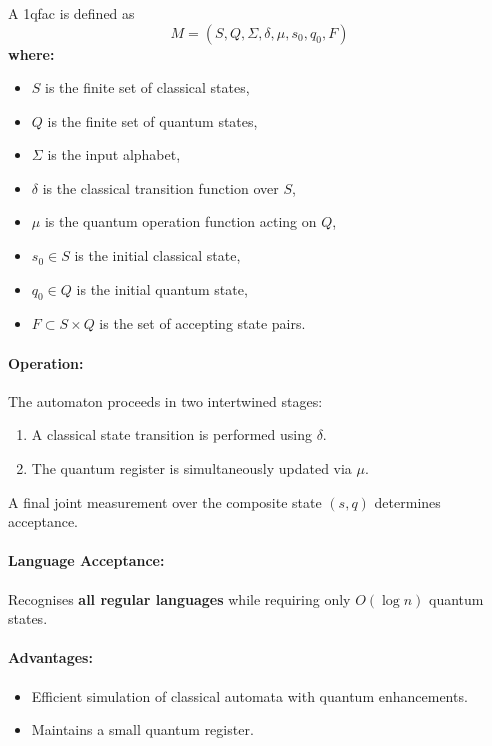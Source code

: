 \subsubsection{}
\label{subsec:1qfac}
\begin{definition}
A \gls{1qfac} is defined as 
\[
M = (S, Q, \Sigma, \delta, \mu, s_0, q_0, F)
\]
\textbf{where:}
\begin{itemize}
    \item \( S \) is the finite set of classical states,
    \item \( Q \) is the finite set of quantum states,
    \item \( \Sigma \) is the input alphabet,
    \item \( \delta \) is the classical transition function over \( S \),
    \item \( \mu \) is the quantum operation function acting on \( Q \),
    \item \( s_0 \in S \) is the initial classical state,
    \item \( q_0 \in Q \) is the initial quantum state,
    \item \( F \subset S \times Q \) is the set of accepting state pairs.
\end{itemize}
\end{definition}

\paragraph{Operation:}  
The automaton proceeds in two intertwined stages:
\begin{enumerate}
    \item A classical state transition is performed using \( \delta \).
    \item The quantum register is simultaneously updated via \( \mu \).
\end{enumerate}
A final joint measurement over the composite state \( (s, q) \) determines acceptance.

\paragraph{Language Acceptance:}  
Recognises \textbf{all regular languages} while requiring only \( O(\log n) \) quantum states.

\paragraph{Advantages:}
\begin{itemize}
    \item Efficient simulation of classical automata with quantum enhancements.
    \item Maintains a small quantum register.
\end{itemize}

